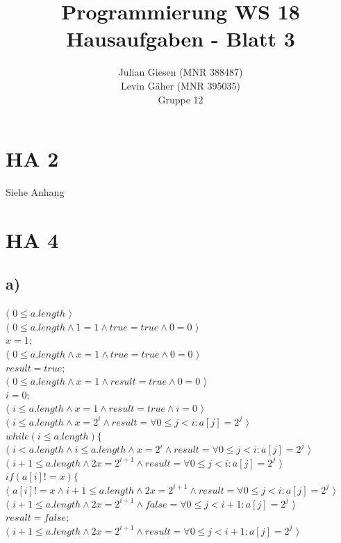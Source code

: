 \documentclass[a4paper]{article}
\title{ Programmierung WS 18 \\ Hausaufgaben - Blatt 3 }
\author{ Julian Giesen (MNR 388487) \\
Levin Gäher (MNR 395035) \\
Gruppe 12 }
\date{  }
\begin{document}
\maketitle

\section*{ HA 2 }


Siehe Anhang

\section*{ HA 4 }

\subsection*{a)}
$\langle$ $0 \leq a.length$ $\rangle$\\
$\langle$ $0 \leq a.length \land 1=1 \land true = true \land 0 = 0$ $\rangle$\\
$x = 1;$ \\
$\langle$ $0 \leq a.length \land x=1 \land true = true \land 0 = 0$ $\rangle$\\
$result = true;$ \\
$\langle$ $0 \leq a.length \land x=1 \land result = true \land 0 = 0$ $\rangle$\\
$i = 0;$ \\
$\langle$ $i \leq a.length \land x=1 \land result = true \land i = 0$ $\rangle$\\
$\langle$ $i \leq a.length \land x=2^i \land result = \forall 0 \leq j < i: a[j] = 2^j$ $\rangle$\\
$while (i \leq a.length) \{$ \\
$\langle$ $i < a.length \land i \leq a.length \land x=2^i \land result = \forall 0 \leq j < i: a[j] = 2^j$ $\rangle$\\
$\langle$ $i + 1 \leq a.length \land 2x=2^{i + 1} \land result = \forall 0 \leq j < i: a[j] = 2^j$ $\rangle$\\
$if (a[i] != x) \{$\\
$\langle$ $a[i] != x \land i + 1 \leq a.length \land 2x=2^{i + 1} \land result = \forall 0 \leq j < i: a[j] = 2^j$ $\rangle$\\
$\langle$ $i + 1 \leq a.length \land 2x=2^{i + 1} \land false = \forall 0 \leq j < i + 1: a[j] = 2^j$ $\rangle$\\
$result = false;$\\
$\langle$ $i + 1 \leq a.length \land 2x=2^{i + 1} \land result = \forall 0 \leq j < i + 1 : a[j] = 2^j$ $\rangle$\\
\end{document}
